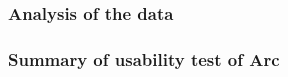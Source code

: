 \subsubsection{Analysis of the data}\label{subsubsec:analysisOfTheData}

\subsubsection{Summary of usability test of Arc}



